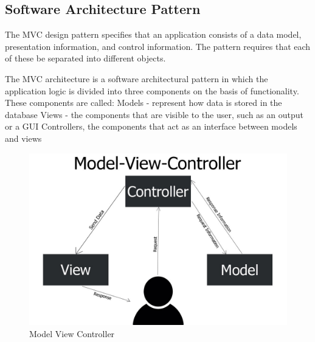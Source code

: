 \subsection{Software Architecture Pattern}

The \ac{MVC} design pattern specifies that an application consists of a data model, presentation information, and control information. The pattern requires that each of these be separated into different objects.

The MVC architecture is a software architectural pattern in which the application logic is divided into three components on the basis of functionality. These components are called: Models - represent how data is stored in the database Views - the components that are visible to the user, such as an output or a GUI Controllers, the components that act as an interface between models and views


\begin{figure}[!ht]
      \center
      \includegraphics[scale=0.25]{assets/mvc.jpg}
      \caption{Model View Controller}
      \label{fig:mvc}
\end{figure}

